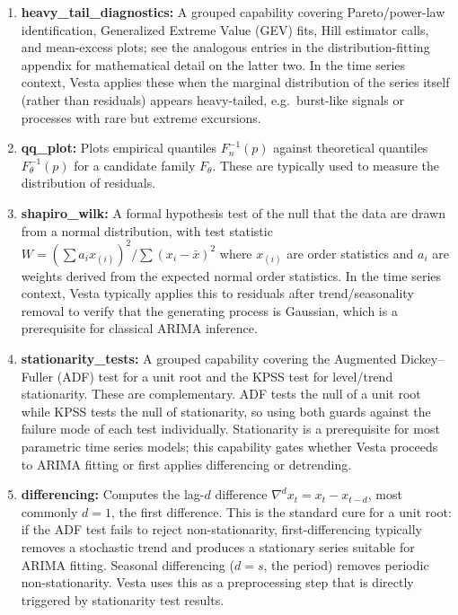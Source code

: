\documentclass{article}
\newcommand{\method}{{\sc Vesta}}
\begin{document}
\begin{enumerate}
    \item \textbf{heavy\_tail\_diagnostics:} A grouped capability covering Pareto/power-law identification, Generalized Extreme Value (GEV) fits, Hill estimator calls, and mean-excess plots; see the analogous entries in the distribution-fitting appendix for mathematical detail on the latter two. In the time series context, \method{} applies these when the marginal distribution of the series itself (rather than residuals) appears heavy-tailed, e.g.\ burst-like signals or processes with rare but extreme excursions.

    \item \textbf{qq\_plot:} Plots empirical quantiles $F_n^{-1}(p)$ against theoretical quantiles $F_\theta^{-1}(p)$ for a candidate family $F_\theta$. These are typically used to measure the distribution of residuals.

    \item \textbf{shapiro\_wilk:} A formal hypothesis test of the null that the data are drawn from a normal distribution, with test statistic $W = (\sum a_i x_{(i)})^2 / \sum (x_i - \bar{x})^2$ where $x_{(i)}$ are order statistics and $a_i$ are weights derived from the expected normal order statistics. In the time series context, \method{} typically applies this to residuals after trend/seasonality removal to verify that the generating process is Gaussian, which is a prerequisite for classical ARIMA inference.

    \item \textbf{stationarity\_tests:} A grouped capability covering the Augmented Dickey--Fuller (ADF) test for a unit root and the KPSS test for level/trend stationarity. These are complementary. ADF tests the null of a unit root while KPSS tests the null of stationarity, so using both guards against the failure mode of each test individually. Stationarity is a prerequisite for most parametric time series models; this capability gates whether \method{} proceeds to ARIMA fitting or first applies differencing or detrending.

    \item \textbf{differencing:} Computes the lag-$d$ difference $\nabla^d x_t = x_t - x_{t-d}$, most commonly $d=1$, the first difference. This is the standard cure for a unit root: if the ADF test fails to reject non-stationarity, first-differencing typically removes a stochastic trend and produces a stationary series suitable for ARIMA fitting. Seasonal differencing ($d = s$, the period) removes periodic non-stationarity. \method{} uses this as a preprocessing step that is directly triggered by stationarity test results.


\end{enumerate}
\end{document}
